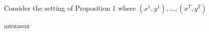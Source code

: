 \begin{exercise}[]{}
Consider the setting of Proposition 1 where $ (x^{1}, y^{1}),\ldots,(x^{T},y^{T})$
\end{exercise}

\begin{solution}[]
    azezaeaz
\end{solution}
